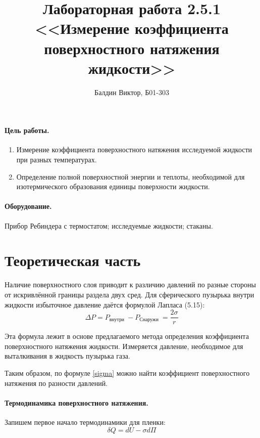 \documentclass[12pt]{article}
\title{ 
    Лабораторная работа 2.5.1 \\
    <<Измерение коэффициента поверхностного натяжения жидкости>>
}
\author{Балдин Виктор, Б01-303}
\begin{document}
    \maketitle
    \paragraph{Цель работы.}
    \begin{enumerate}
        \item Измерение коэффициента поверхностного натяжения исследуемой 
        жидкости при разных температурах.
        \item Определение полной поверхностной энергии и теплоты, необходимой
        для изотермического образования единицы поверхности жидкости.
    \end{enumerate}
    \paragraph{Оборудование.}
    Прибор Ребиндера с термостатом; исследуемые жидкости; стаканы.
    
    \section{Теоретическая часть}
    Наличие поверхностного слоя приводит к различию давлений по разные стороны
    от искривлённой границы раздела двух сред. Для сферического пузырька внутри
    жидкости избыточное давление даётся формулой Лапласа (5.15):
    \begin{equation}
        \Delta P=P_{\text {внутри }}-P_{\text {Снаружи }}=\frac{2 \sigma}{r}
        \label{sigma}
    \end{equation}

    Эта формула лежит в основе предлагаемого метода определения коэффициента
    поверхностного натяжения жидкости. Измеряется давление, необходимое для
    выталкивания в жидкость пузырька газа.
    
    Таким образом, по формуле \ref{sigma} можно найти коэффициент 
    поверхностного натяжения по разности давлений.

    \paragraph{Термодинамика поверхностного натяжения.}
    Запишем первое начало термодинамики для пленки:
    \begin{equation}
        \delta Q = dU - \sigma d\Pi
    \end{equation}
    
\end{document}

